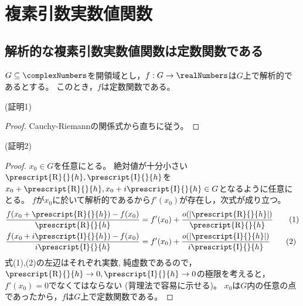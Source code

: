 \chapter{複素引数実数値関数}
    \section{解析的な複素引数実数値関数は定数関数である}
        \label{解析的な複素引数実数値関数は定数関数である}
        \begin{shadebox}
            $G\subseteq\complexNumbers$を開領域とし，$f:G\to\realNumbers$は$G$上で解析的であるとする。
            このとき，$f$は定数関数である。
        \end{shadebox}
        \noindent
        (証明1)
        \begin{proof}
            Cauchy-Riemannの関係式から直ちに従う。
        \end{proof}
        \noindent
        (証明2)
        \newcommand{\Rh}{\prescript{\text{R}}{}{h}}
        \newcommand{\Ih}{\prescript{\text{I}}{}{h}}
        \begin{proof}
            \quad\par
            $x_0\in G$を任意にとる。
            絶対値が十分小さい$\Rh,\Ih$を$x_0+\Rh, x_0+i\Ih \in G$となるように任意にとる。
            $f$が$x_0$に於いて解析的であるから$f'(x_0)$が存在し，次式が成り立つ。
            \begin{align*}
                \frac{f(x_0+\Rh) - f(x_0)}{\Rh} &= f'(x_0) + \frac{o(|\Rh|)}{\Rh} \tag{1}\\
                \frac{f(x_0+i\Ih) - f(x_0)}{i\Ih} &= f'(x_0) + \frac{o(|\Ih|)}{i\Ih} \tag{2}
            \end{align*}
            式(1),(2)の左辺はそれぞれ実数, 純虚数であるので，$\Rh\to 0,\Ih\to 0$の極限を考えると，$f'(x_0) = 0$でなくてはならない
            (背理法で容易に示せる)。
            $x_0$は$G$内の任意の点であったから，$f$は$G$上で定数関数である。
        \end{proof}
